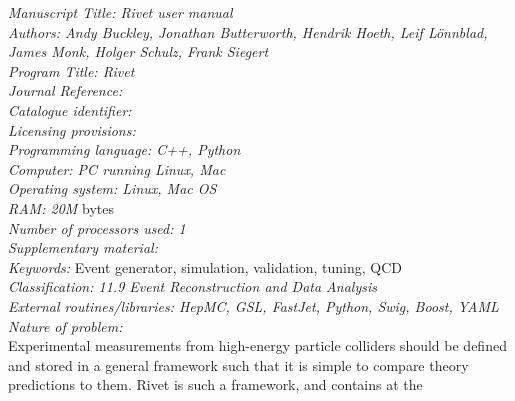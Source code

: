 \documentclass[preprint,12pt]{elsarticle}
\begin{document}
\begin{small}
  \noindent
  {\em Manuscript Title: Rivet user manual}\\
  {\em Authors: Andy Buckley, Jonathan Butterworth, Hendrik Hoeth,
    Leif L\"onnblad, James Monk, Holger Schulz, Frank Siegert}\\
  {\em Program Title: Rivet}\\
  {\em Journal Reference:}                                      \\
  {\em Catalogue identifier:}                                   \\
  {\em Licensing provisions:}                                   \\
  {\em Programming language: C++, Python}\\
  {\em Computer: PC running Linux, Mac}\\
  {\em Operating system: Linux, Mac OS}\\
  {\em RAM: 20M} bytes\\
  {\em Number of processors used: 1}                              \\
  {\em Supplementary material:}                                 \\
  {\em Keywords:} Event generator, simulation, validation, tuning, QCD  \\
  {\em Classification: 11.9 Event Reconstruction and Data Analysis}\\
  {\em External routines/libraries: HepMC, GSL, FastJet, Python, Swig, Boost, YAML}\\
  {\em Nature of problem:}\\
  Experimental measurements from high-energy particle colliders should be
  defined and stored in a general framework such that it is simple to compare
  theory predictions to them. Rivet is such a framework, and contains at the

\end{small}
\end{document}
